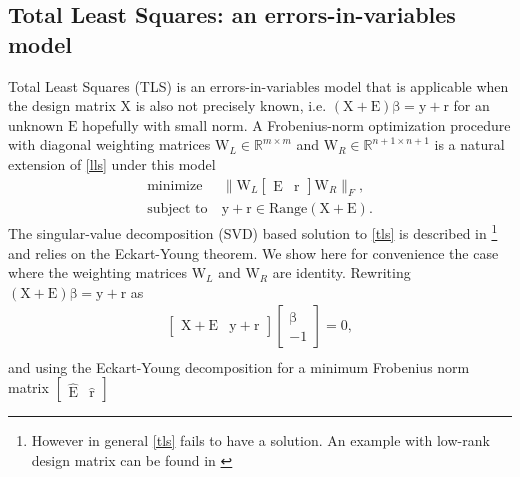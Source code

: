 \documentclass[10pt,a4paper]{article}
\newcommand{\boldvec}[1]{\boldsymbol{\mathrm{#1}}}
\let\vec\boldvec
\newcommand{\designMat}{\vec{X}} %
\newcommand{\observations}{\vec{y}} %
\newcommand{\param}{\vec{\beta}} %
\newcommand{\residual}{\vec{r}} %
\newcommand{\weightingMat}{\vec{W}} %
\newcommand{\errorMat}{\vec{E}} %
\begin{document}
\subsection{Total Least Squares: an errors-in-variables model}

Total Least Squares (TLS) is an errors-in-variables model that is applicable when the design matrix $\designMat$ is also not precisely known,
i.e. $(\designMat + \errorMat)\param = \observations + \residual$ for an unknown $\errorMat$ hopefully with small norm. A Frobenius-norm optimization procedure with diagonal weighting matrices $\weightingMat_{L} \in \mathbb{R}^{m \times m}$ and $\weightingMat_{R} \in \mathbb{R}^{n+1 \times n+1}$ is a natural extension of \ref{lls} under this model
%
\begin{equation}
\begin{aligned}
\text{minimize} &\ \| \weightingMat_{L} \begin{bmatrix} \errorMat & \residual \end{bmatrix} \weightingMat_{R} \|_{F}, \\
\text{subject to} &\ \observations + \residual \in \text{Range}(\designMat + \errorMat).
\end{aligned}
\label{tls}
\end{equation}
%
\noindent The singular-value decomposition (SVD) based solution to \eqref{tls} is described in \cite{Golub80} \footnote{However in general \ref{tls} fails to have a solution. An example with low-rank design matrix can be found in \cite{Golub80}} and relies on the Eckart-Young theorem. We show here for convenience the case where the weighting matrices $\weightingMat_{L}$ and $\weightingMat_{R}$ are identity. Rewriting $(\designMat + \errorMat)\param = \observations + \residual$ as  
%
\begin{equation}
\begin{aligned}
\begin{bmatrix} \designMat + \errorMat & \observations + \residual \end{bmatrix} \begin{bmatrix} \param \\ -1 \end{bmatrix} = 0, \\
\end{aligned}
\end{equation}
%
\noindent and using the Eckart-Young decomposition for a minimum Frobenius norm matrix $\begin{bmatrix} \hat{\errorMat} & \hat{\residual} \end{bmatrix}$%
%
\end{document}
